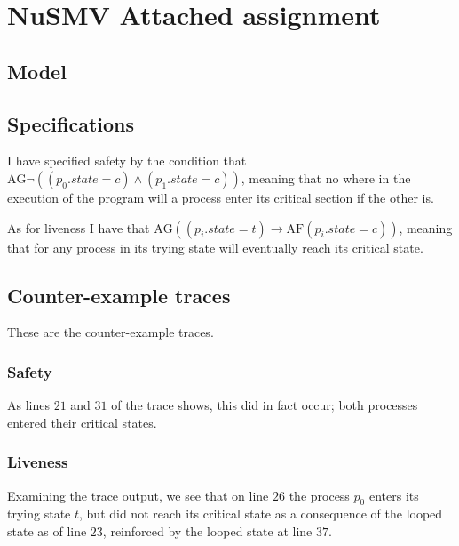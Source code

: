 \documentclass[11pt,a4paper]{article}
\let\imp\to
\begin{document}
\newpage
\section*{NuSMV \mdseries Attached assignment}
\subsection*{Model}


\newpage
\subsection*{Specifications}
I have specified safety by the condition that $\text{AG} \neg( (p_0.state = c)
\land (p_1.state = c) )$, meaning that no where in the execution of the program
will a process enter its critical section if the other is.

As for liveness I have that $\text{AG} ( (p_i.state = t) \imp \text{AF}
(p_i.state = c) )$, meaning that for any process in its trying state will
eventually reach its critical state.

\subsection*{Counter-example traces}
These are the counter-example traces.

\subsubsection*{Safety}

As lines $21$ and $31$ of the trace shows, this did in fact occur; both
processes entered their critical states.

\newpage
\subsubsection*{Liveness}

Examining the trace output, we see that on line $26$ the process $p_0$ enters
its trying state $t$, but did not reach its critical state as a consequence of
the looped state as of line $23$, reinforced by the looped state at line $37$.
\end{document}
